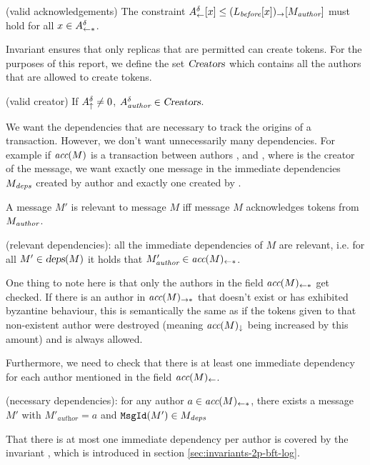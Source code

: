 \begin{invariant}{}
    (valid acknowledgements) The constraint $A^\delta_\leftarrow[x] \le (L_\textit{before}[x])_\rightarrow[M_\emph{author}]$ must hold for all $x \in A^\delta_{\leftarrow*}$.
\end{invariant}
Invariant  ensures that only replicas that are permitted can create tokens. For the purposes of this report, we define the set $\textsl{Creators}$ which contains all the authors that are allowed to create tokens.
\begin{invariant}{}
    (valid creator) If $A^\delta_\uparrow \neq 0$, $A^\delta_\emph{author} \in \textsl{Creators}$.
\end{invariant}

We want the dependencies that are necessary to track the origins of a transaction. However, we don't want unnecessarily many dependencies. For example if $\textit{acc}(M)$ is a transaction between authors ,  and , where  is the creator of the message, we want exactly one message in the immediate dependencies $M_\emph{deps}$ created by author  and exactly one created by .

A message $M'$ is relevant to message $M$ iff message $M$ acknowledges tokens from $M_\emph{author}$.
\begin{invariant}{}
    (relevant dependencies): all the immediate dependencies of $M$ are relevant, i.e. for all $M' \in \textsl{deps}(M)$ it holds that $M'_\textit{author} \in \textit{acc}(M)_{\leftarrow *}$.
\end{invariant}
One thing to note here is that only the authors in the field $\textit{acc}(M)_{\leftarrow *}$ get checked. If there is an author in $\textit{acc}(M)_{\rightarrow *}$ that doesn't exist or has exhibited byzantine behaviour, this is semantically the same as if the tokens given to that non-existent author were destroyed (meaning $\textit{acc}(M)_\downarrow$ being increased by this amount) and is always allowed.

Furthermore, we need to check that there is at least one immediate dependency for each author mentioned in the field $\textit{acc}(M)_\leftarrow$.
\begin{invariant}{}
    (necessary dependencies): for any author $a \in \textit{acc}(M)_{\leftarrow *}$, there exists a message $M'$ with $M'_\textit{author} = a$ and $\texttt{MsgId}(M') \in M_\textit{deps}$
\end{invariant}

That there is at most one immediate dependency per author is covered by the invariant , which is introduced in section \ref{sec:invariants-2p-bft-log}.

